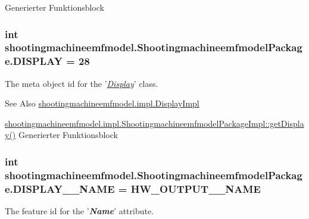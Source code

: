 Generierter Funktionsblock  \hypertarget{interfaceshootingmachineemfmodel_1_1_shootingmachineemfmodel_package_a5192d9d2f65949d1265252867e80bb70}{
\subsubsection[{D\-I\-S\-P\-L\-A\-Y}]{\setlength{\rightskip}{0pt plus 5cm}int shootingmachineemfmodel.\-Shootingmachineemfmodel\-Package.\-D\-I\-S\-P\-L\-A\-Y = 28}}\label{interfaceshootingmachineemfmodel_1_1_shootingmachineemfmodel_package_a5192d9d2f65949d1265252867e80bb70}
The meta object id for the '\hyperlink{classshootingmachineemfmodel_1_1impl_1_1_display_impl}{{\itshape Display}}' class.

\begin{DoxySeeAlso}{See Also}
\hyperlink{classshootingmachineemfmodel_1_1impl_1_1_display_impl}{shootingmachineemfmodel.\-impl.\-Display\-Impl} 

\hyperlink{classshootingmachineemfmodel_1_1impl_1_1_shootingmachineemfmodel_package_impl_aeb5fff339c8b842a0d511fa06ca98023}{shootingmachineemfmodel.\-impl.\-Shootingmachineemfmodel\-Package\-Impl\-::get\-Display()} Generierter Funktionsblock 
\end{DoxySeeAlso}
\hypertarget{interfaceshootingmachineemfmodel_1_1_shootingmachineemfmodel_package_a285c9b72184c985918ffefe121eabcd9}{
\subsubsection[{D\-I\-S\-P\-L\-A\-Y\-\_\-\-\_\-\-N\-A\-M\-E}]{\setlength{\rightskip}{0pt plus 5cm}int shootingmachineemfmodel.\-Shootingmachineemfmodel\-Package.\-D\-I\-S\-P\-L\-A\-Y\-\_\-\-\_\-\-N\-A\-M\-E = {\bf H\-W\-\_\-\-O\-U\-T\-P\-U\-T\-\_\-\-\_\-\-N\-A\-M\-E}}}\label{interfaceshootingmachineemfmodel_1_1_shootingmachineemfmodel_package_a285c9b72184c985918ffefe121eabcd9}
The feature id for the '{\itshape {\bfseries Name}}' attribute.

